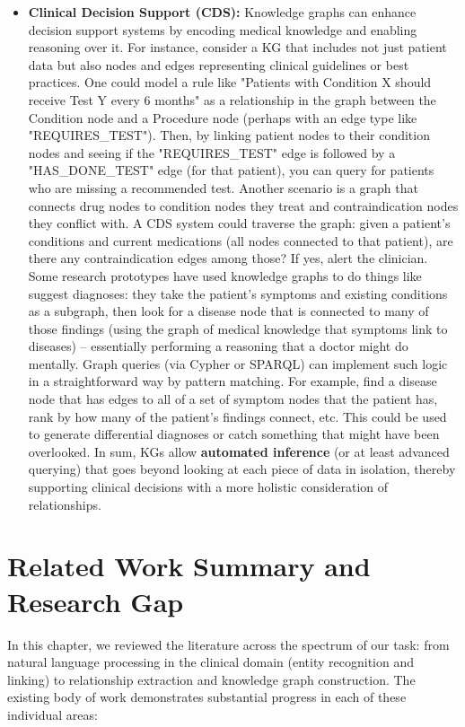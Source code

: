 \begin{itemize}
\item \textbf{Clinical Decision Support (CDS):} Knowledge graphs can enhance decision support systems by encoding medical knowledge and enabling reasoning over it. For instance, consider a KG that includes not just patient data but also nodes and edges representing clinical guidelines or best practices. One could model a rule like "Patients with Condition X should receive Test Y every 6 months" as a relationship in the graph between the Condition node and a Procedure node (perhaps with an edge type like "REQUIRES\_TEST"). Then, by linking patient nodes to their condition nodes and seeing if the "REQUIRES\_TEST" edge is followed by a "HAS\_DONE\_TEST" edge (for that patient), you can query for patients who are missing a recommended test. Another scenario is a graph that connects drug nodes to condition nodes they treat and contraindication nodes they conflict with. A CDS system could traverse the graph: given a patient's conditions and current medications (all nodes connected to that patient), are there any contraindication edges among those? If yes, alert the clinician. Some research prototypes have used knowledge graphs to do things like suggest diagnoses: they take the patient's symptoms and existing conditions as a subgraph, then look for a disease node that is connected to many of those findings (using the graph of medical knowledge that symptoms link to diseases) – essentially performing a reasoning that a doctor might do mentally. Graph queries (via Cypher or SPARQL) can implement such logic in a straightforward way by pattern matching. For example, find a disease node that has edges to all of a set of symptom nodes that the patient has, rank by how many of the patient's findings connect, etc. This could be used to generate differential diagnoses or catch something that might have been overlooked. In sum, KGs allow \textbf{automated inference} (or at least advanced querying) that goes beyond looking at each piece of data in isolation, thereby supporting clinical decisions with a more holistic consideration of relationships.
\end{itemize}

\section{Related Work Summary and Research Gap}

In this chapter, we reviewed the literature across the spectrum of our task: from natural language processing in the clinical domain (entity recognition and linking) to relationship extraction and knowledge graph construction. The existing body of work demonstrates substantial progress in each of these individual areas:

